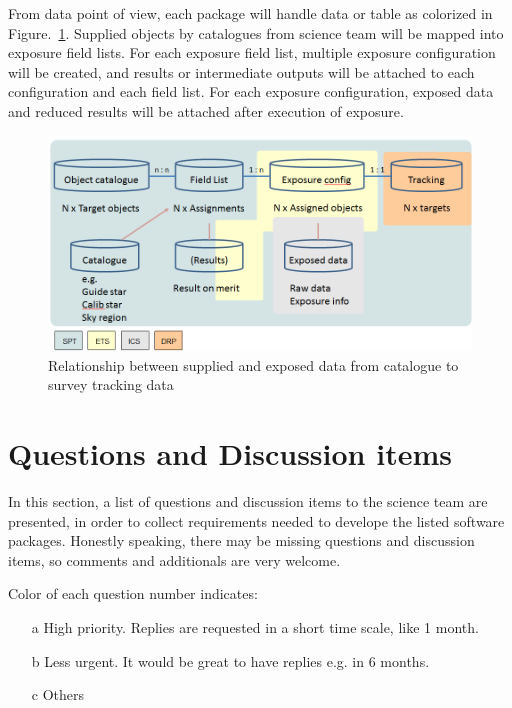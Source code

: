 \documentclass[a4paper,notitlepage]{article}
\newcommand{\cols}[1]{\textcolor{ccols}{#1}}
\newcommand{\coll}[1]{\textcolor{ccoll}{#1}}
\begin{document}
From data point of view, each package will handle data or table as colorized 
in Figure.~\ref{fig:sciops-scireq-slide-data}. 
Supplied objects by catalogues from science team will be mapped into 
exposure field lists. For each exposure field list, multiple exposure 
configuration will be created, and results or intermediate outputs 
will be attached to each configuration and each field list. 
For each exposure configuration, exposed data and reduced results will be 
attached after execution of exposure. 

\begin{figure}[htb]
  \begin{center}
    \includegraphics[width=.75\linewidth]{sciops-scireq-slide-data.png}
  \end{center}
  \caption{Relationship between supplied and exposed data from catalogue to 
    survey tracking data}
  \label{fig:sciops-scireq-slide-data}
\end{figure}

\section{Questions and Discussion items}

In this section, a list of questions and discussion items to the science
team are presented, in order to collect requirements needed to develope
the listed software packages. Honestly speaking, there may be missing
questions and discussion items, so comments and additionals are very
welcome.

Color of each question number indicates: 
\begin{enumerate}
  \item[\cols{a}] High priority. Replies are requested in a short time
	       scale, like 1 month.
  \item[\coll{b}] Less urgent. It would be great to have replies e.g. in
	       6 months.
  \item[c] Others
\end{enumerate}
\end{document}
